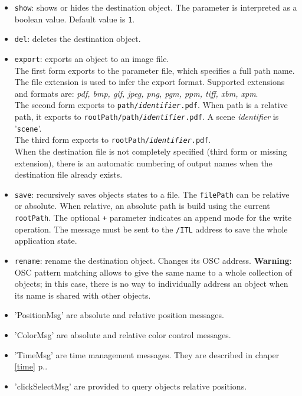 \documentclass[a4paper,twoside]{report}
\newcommand{\fullref}[1]	{\ref{#1} p.\pageref{#1}}
\newcommand{\OSC}[1]		{\texttt{#1}}
\newcommand{\values}[1]	{\texttt{#1}}
\begin{document}
\begin{itemize}
\item \OSC{show}: shows or hides the destination object. The parameter is interpreted as a boolean value. Default value is \values{1}. 
\item \OSC{del}: deletes the destination object. 

\item \OSC{export}: exports an object to an image file. \\
The first form exports to the parameter file, which specifies a full path name. The file extension is used to infer the export format. Supported extensions and formats are: \emph{pdf, bmp, gif, jpeg, png, pgm, ppm, tiff, xbm, xpm}. \\
The second form exports to \OSC{path/\textit{identifier}.pdf}. When path is a relative path, it exports to \OSC{rootPath/path/\textit{identifier}.pdf}. A scene \textit{identifier} is '\OSC{scene}'.\\
The third form exports to \OSC{rootPath/\textit{identifier}.pdf}.\\
When the destination file is not completely specified (third form or missing extension), there is an automatic numbering of output names when the destination file already exists.

\item \OSC{save}: recursively saves objects states to a file.  The \OSC{filePath} can be relative or absolute. When relative, an absolute path is build using the current \OSC{rootPath}. The optional \OSC{+} parameter indicates an append mode for the write operation. The message must be sent to the \OSC{/ITL} address to save the whole application state.
\item \OSC{rename}: rename the destination object. Changes its OSC address. \textbf{Warning}: OSC pattern matching allows to give the same name to a whole collection of objects; in this case, there is no way to individually address an object when its name is shared with other objects.
\item 'PositionMsg' are absolute and relative position messages.
\item 'ColorMsg' are absolute and relative color control messages.
\item 'TimeMsg' are time management messages. They are described in chaper \fullref{time}.
\item 'clickSelectMsg' are provided to query objects relative positions.
\end{itemize}
\end{document}
